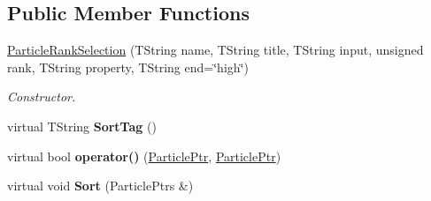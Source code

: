\subsection*{Public Member Functions}
\begin{DoxyCompactItemize}
\item 
\hyperlink{class_h_a_l_1_1_algorithms_1_1_particle_rank_selection_acbba84c85f7090200eda0d2a0bd9c677}{Particle\-Rank\-Selection} (T\-String name, T\-String title, T\-String input, unsigned rank, T\-String property, T\-String end=\char`\"{}high\char`\"{})
\begin{DoxyCompactList}\small\item\em Constructor. \end{DoxyCompactList}\item 
\hypertarget{class_h_a_l_1_1_algorithms_1_1_particle_rank_selection_acce9ba5e039ebd2040b5f7172586e5b1}{virtual T\-String {\bfseries Sort\-Tag} ()}\label{class_h_a_l_1_1_algorithms_1_1_particle_rank_selection_acce9ba5e039ebd2040b5f7172586e5b1}

\item 
\hypertarget{class_h_a_l_1_1_algorithms_1_1_particle_rank_selection_ac1e2275f72f43fd1e80fdbdefbfe9aaf}{virtual bool {\bfseries operator()} (\hyperlink{class_h_a_l_1_1_generic_particle}{Particle\-Ptr}, \hyperlink{class_h_a_l_1_1_generic_particle}{Particle\-Ptr})}\label{class_h_a_l_1_1_algorithms_1_1_particle_rank_selection_ac1e2275f72f43fd1e80fdbdefbfe9aaf}

\item 
\hypertarget{class_h_a_l_1_1_algorithms_1_1_particle_rank_selection_a0519f017f9142ce0d484b3e99f70aa19}{virtual void {\bfseries Sort} (Particle\-Ptrs \&)}\label{class_h_a_l_1_1_algorithms_1_1_particle_rank_selection_a0519f017f9142ce0d484b3e99f70aa19}

\end{DoxyCompactItemize}
